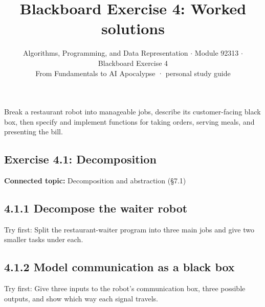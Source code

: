 \documentclass[11pt]{article}
\title{\sffamily\bfseries\color{FAUblue}Blackboard Exercise 4: Worked solutions}
\author{Algorithms, Programming, and Data Representation \ensuremath{\cdot} Module 92313 \ensuremath{\cdot} Blackboard Exercise 4\\[2pt]\small From Fundamentals to AI Apocalypse · personal study guide}
\date{}
\begin{document}
\maketitle
\begingroup\footnotesize\setlength{\parskip}{0pt}\tableofcontents\endgroup
\clearpage

{\large Break a restaurant robot into manageable jobs, describe its customer-facing black box, then specify and implement functions for taking orders, serving meals, and presenting the bill.}


\begin{keepsection}
\section{Exercise 4.1: Decomposition}

\textbf{Connected topic:} Decomposition and abstraction (§7.1)

\begin{keepsection}
\subsection{4.1.1 Decompose the waiter robot}

Try first: Split the restaurant-waiter program into three main jobs and give two smaller tasks under each.

\end{keepsection}

\begin{keepsection}
\subsection{4.1.2 Model communication as a black box}

Try first: Give three inputs to the robot's communication box, three possible outputs, and show which way each signal travels.

\end{keepsection}
\end{keepsection}
\end{document}
